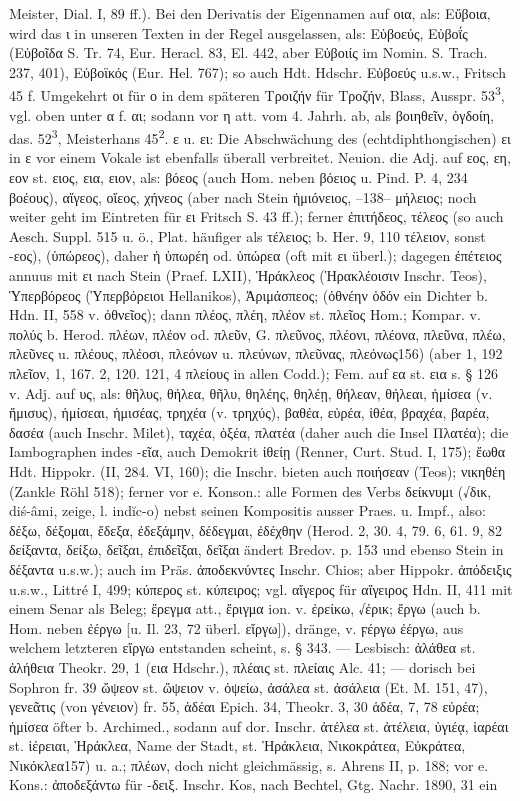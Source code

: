 Meister, Dial. I, 89 ff.). Bei den Derivatis der Eigennamen auf οια, als: Εὔβοια, wird das ι in unseren Texten in der Regel ausgelassen, als: Εὐβοεύς, Εὐβοΐς (Εὐβοῖδα S. Tr. 74, Eur. Heracl. 83, El. 442, aber Εὐβοιίς im Nomin. S. Trach. 237, 401), Εὐβοϊκός (Eur. Hel. 767); so auch Hdt. Hdschr. Εὐβοεύς u.s.w., Fritsch 45 f. Umgekehrt οι für ο in dem späteren Τροιζήν für Τροζήν, Blass, Ausspr. 53\textsuperscript{3}, vgl. oben unter α f. αι; sodann vor η att. vom 4. Jahrh. ab, als βοιηθεῖν, ὀγδοίη, das. 52\textsuperscript{3}, Meisterhans 45\textsuperscript{2}. ε u. ει: Die Abschwächung des (echtdiphthongischen) ει in ε vor einem Vokale ist ebenfalls überall verbreitet. Neuion. die Adj. auf εος, εη, εον st. ειος, εια, ειον, als: βόεος (auch Hom. neben βόειος u. Pind. P. 4, 234 βοέους), αἴγεος, οἴεος, χήνεος (aber nach Stein ἡμιόνειος, --138-- μήλειος; noch weiter geht im Eintreten für ει Fritsch S. 43 ff.); ferner ἐπιτήδεος, τέλεος (so auch Aesch. Suppl. 515 u. ö., Plat. häufiger als τέλειος; b. Her. 9, 110 τέλειον, sonst -εος), (ὑπώρεος), daher ἡ ὑπωρέη od. ὑπώρεα (oft mit ει überl.); dagegen ἐπέτειος annuus mit ει nach Stein (Praef. LXII), Ἡράκλεος (Ἡρακλέοισιν Inschr. Teos), Ὑπερβόρεος (Ὑπερβόρειοι Hellanikos), Ἀριμάσπεος; (ὀθνέην ὁδόν ein Dichter b. Hdn. II, 558 v. ὀθνεῖος); dann πλέος, πλέη, πλέον st. πλεῖος Hom.; Kompar. v. πολύς b. Herod. πλέων, πλέον od. πλεῦν, G. πλεῦνος, πλέονι, πλέονα, πλεῦνα, πλέω, πλεῦνες u. πλέους, πλέοσι, πλεόνων u. πλεύνων, πλεῦνας, πλεόνως156) (aber 1, 192 πλεῖον, 1, 167. 2, 120. 121, 4 πλείους in allen Codd.); Fem. auf εα st. εια s. § 126 v. Adj. auf υς, als: θῆλυς, θήλεα, θῆλυ, θηλέης, θηλέῃ, θήλεαν, θήλεαι, ἡμίσεα (v. ἥμισυς), ἡμίσεαι, ἡμισέας, τρηχέα (v. τρηχύς), βαθέα, εὐρέα, ἰθέα, βραχέα, βαρέα, δασέα (auch Inschr. Milet), ταχέα, ὀξέα, πλατέα (daher auch die Insel Πλατέα); die Iambographen indes -εῖα, auch Demokrit ἰθείῃ (Renner, Curt. Stud. I, 175); ἔωθα Hdt. Hippokr. (II, 284. VI, 160); die Inschr. bieten auch ποιήσεαν (Teos); νικηθέη (Zankle Röhl 518); ferner vor e. Konson.: alle Formen des Verbs δείκνυμι (√δικ, diś-âmi, zeige, l. indĭc-o) nebst seinen Kompositis ausser Praes. u. Impf., also: δέξω, δέξομαι, ἔδεξα, ἐδεξάμην, δέδεγμαι, ἐδέχθην (Herod. 2, 30. 4, 79. 6, 61. 9, 82 δείξαντα, δείξω, δεῖξαι, ἐπιδεῖξαι, δεῖξαι ändert Bredov. p. 153 und ebenso Stein in δέξαντα u.s.w.); auch im Präs. ἀποδεκνύντες Inschr. Chios; aber Hippokr. ἀπόδειξις u.s.w., Littré Ι, 499; κύπερος st. κύπειρος; vgl. αἴγερος für αἴγειρος Hdn. II, 411 mit einem Senar als Beleg; ἔρεγμα att., ἔριγμα ion. v. ἐρείκω, √ἐρικ; ἔργω (auch b. Hom. neben ἐέργω [u. Il. 23, 72 überl. εἴργω]), dränge, v. ϝέργω ἐέργω, aus welchem letzteren εἴργω entstanden scheint, s. § 343. — Lesbisch: ἀλάθεα st. ἀλήθεια Theokr. 29, 1 (εια Hdschr.), πλέαις st. πλείαις Alc. 41; — dorisch bei Sophron fr. 39 ὤψεον st. ὤψειον v. ὀψείω, ἀσάλεα st. ἀσάλεια (Et. M. 151, 47), γενεᾶτις (von γένειον) fr. 55, ἁδέαι Epich. 34, Theokr. 3, 30 ἁδέα, 7, 78 εὐρέα; ἡμίσεα öfter b. Archimed., sodann auf dor. Inschr. ἀτέλεα st. ἀτέλεια, ὑγιέᾳ, ἱαρέαι st. ἱέρειαι, Ἡράκλεα, Name der Stadt, st. Ἡράκλεια, Νικοκράτεα, Εὐκράτεα, Νικόκλεα157) u. a.; πλέων, doch nicht gleichmässig, s. Ahrens II, p. 188; vor e. Kons.: ἀποδεξάντω für -δειξ. Inschr. Kos, nach Bechtel, Gtg. Nachr. 1890, 31 ein 